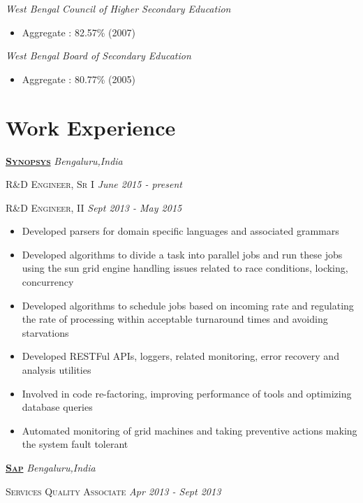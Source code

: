 \documentclass[]{article}
\begin{document}
{{{{{{\raggedright\textit{West Bengal Council of Higher Secondary Education}}
\begin{itemize}
\item Aggregate : 82.57\% (2007)
\end{itemize}

{\raggedright\textit{West Bengal Board of Secondary Education}}
\begin{itemize}
\item Aggregate : 80.77\% (2005)
\end{itemize}

\section{Work Experience}

{\raggedright\textsc{\textbf{\href{http://www.synopsys.com/}{Synopsys}}} \hfill {\raggedleft\textit{Bengaluru,India}}

{\raggedright\textsc{R\&D Engineer, Sr I} \hfill {\raggedleft\textit{June 2015 - present}}

{\raggedright\textsc{R\&D Engineer, II} \hfill {\raggedleft\textit{Sept 2013 - May 2015}}

\begin{itemize}
\item Developed parsers for domain specific languages and associated grammars
\item Developed algorithms to divide a task into parallel jobs and run these jobs using the sun grid engine handling issues related to race conditions, locking, concurrency
\item Developed algorithms to schedule jobs based on incoming rate and regulating the rate of processing within acceptable turnaround times and avoiding starvations
\item Developed RESTFul APIs, loggers, related monitoring, error recovery and analysis utilities
\item Involved in code re-factoring, improving performance of tools and optimizing database queries
\item Automated monitoring of grid machines and taking preventive actions making the system fault tolerant
\end{itemize}

{\raggedright\textsc{\textbf{\href{http://sap.com/}{Sap}}} \hfill {\raggedleft\textit{Bengaluru,India}}

{\raggedright\textsc{Services Quality Associate} \hfill {\raggedleft\textit{Apr 2013 - Sept 2013}}

}}}}}}}}}}
\end{document}
